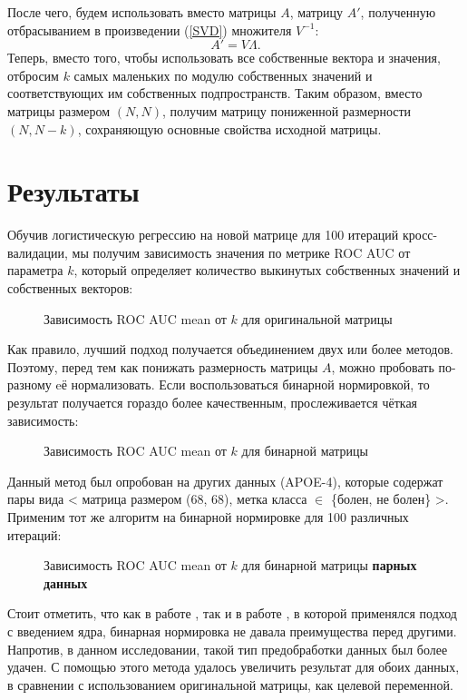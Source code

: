 \documentclass{urticle}
\newcommand{\mys}[1]{\newpage\section*{#1}}
\begin{document}
После чего, будем использовать вместо матрицы $A$, матрицу $A'$, полученную отбрасыванием в произведении (\ref{SVD}) множителя $V^{-1}$:
$$ A' = V \Lambda .$$
Теперь, вместо того, чтобы использовать все собственные вектора и значения, отбросим $k$ самых маленьких по модулю собственных значений и соответствующих им собственных подпространств. Таким образом, вместо матрицы размером $(N, N)$, получим матрицу пониженной размерности $(N, N-k)$, сохраняющую основные свойства исходной матрицы.

\mys{Результаты}
Обучив логистическую регрессию на новой матрице для 100 итераций кросс-валидации, мы получим зависимость значения по метрике ROC AUC от параметра $k$, который определяет количество выкинутых собственных значений и собственных векторов:

\begin{figure}[H]
	\caption{Зависимость ROC AUC mean от $k$ для оригинальной матрицы}
	\label{f1}
\end{figure}

Как правило, лучший подход получается объединением двух или более методов. Поэтому, перед тем как понижать размерность матрицы $A$, можно пробовать по-разному eё нормализовать.
Если воспользоваться бинарной нормировкой, то результат получается гораздо более качественным, прослеживается чёткая зависимость:
\begin{figure}[H]
	\noindent{}
	\caption{Зависимость ROC AUC mean от $k$ для бинарной матрицы}
	\label{f}
\end{figure}

Данный метод был опробован на других данных (APOE-4), которые содержат пары вида < матрица размером (68, 68), метка класса $\in$ \{болен, не болен\} >. Применим тот же алгоритм на бинарной нормировке для 100 различных итераций:

\begin{figure}[H]
	\noindent{}
	\caption{Зависимость ROC AUC mean от $k$ для бинарной матрицы \textbf{парных данных}}
	\label{f3}
\end{figure}

Стоит отметить, что как в работе \cite{article1}, так и в работе \cite{article2}, в которой применялся подход с введением ядра, бинарная нормировка не давала преимущества перед другими. Напротив, в данном исследовании, такой тип предобработки данных был более удачен. С помощью этого метода удалось увеличить результат для обоих данных, в сравнении с использованием оригинальной матрицы, как целевой переменной.
\end{document}
